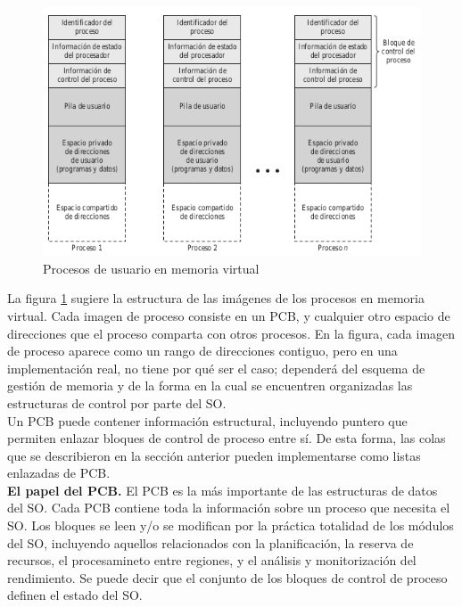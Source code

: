 \documentclass{article}
\begin{document}
				\begin{figure}
				\caption{Procesos de usuario en memoria virtual}
				\label{figura2.13:procesos_mem_virtual}
				\centering
				\includegraphics[width=1\textwidth, scale=1]{tema_2_figura13.png}
				\end{figure}
				
				La figura \ref{figura2.13:procesos_mem_virtual} sugiere la estructura de las imágenes de los procesos en memoria virtual. Cada imagen de proceso consiste en un PCB, y cualquier otro espacio de direcciones que el proceso comparta con otros procesos. En la figura, cada imagen de proceso aparece como un rango de direcciones contiguo, pero en una implementación real, no tiene por qué ser el caso; dependerá del esquema de gestión de memoria y de la forma en la cual se encuentren organizadas las estructuras de control por parte del SO. \\
				Un PCB puede contener información estructural, incluyendo puntero que permiten enlazar bloques de control de proceso entre sí. De esta forma, las colas que se describieron en la sección anterior pueden implementarse como listas enlazadas de PCB. \\
				
				\textbf{El papel del PCB.} El PCB es la más importante de las estructuras de datos del SO. Cada PCB contiene toda la información sobre un proceso que necesita el SO. Los bloques se leen y/o se modifican por la práctica totalidad de los módulos del SO, incluyendo aquellos relacionados con la planificación, la reserva de recursos, el procesamineto entre regiones, y el análisis y monitorización del rendimiento. Se puede decir que el conjunto de los bloques de control de proceso definen el estado del SO. \\
				
\end{document}
